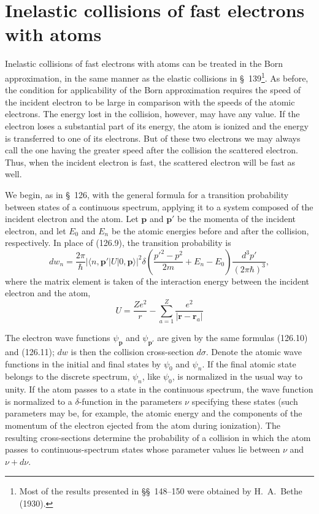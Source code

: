\section{Inelastic collisions of fast electrons with atoms}

Inelastic collisions of fast electrons with atoms can be treated in the Born approximation, in the same manner as the elastic collisions in \S~139\footnote{Most of the results presented in \S\S~148--150 were obtained by H.~A.~Bethe (1930).}. As before, the condition for applicability of the Born approximation requires the speed of the incident electron to be large in comparison with the speeds of the atomic electrons. The energy lost in the collision, however, may have any value. If the electron loses a substantial part of its energy, the atom is ionized and the energy is transferred to one of its electrons. But of these two electrons we may always call the one having the greater speed after the collision the scattered electron. Thus, when the incident electron is fast, the scattered electron will be fast as well.



We begin, as in \S~126, with the general formula for a transition probability between states of a continuous spectrum, applying it to a system composed of the incident electron and the atom. Let $\mathbf p$ and $\mathbf p'$ be the momenta of the incident electron, and let $E_0$ and $E_n$ be the atomic energies before and after the collision, respectively. In place of (126.9), the transition probability is
\begin{equation}
 dw_n=\frac{2\pi}{\hbar}|\langle n,\mathbf p'|U|0,\mathbf p\rangle|^2
 \delta\!\left(\frac{p'^2-p^2}{2m}+E_n-E_0\right)
 \frac{d^3p'}{(2\pi\hbar)^3},
 \tag{148.1}
\end{equation}
where the matrix element is taken of the interaction energy between the incident electron and the atom,
\[
 U=\frac{Ze^2}{r}-\sum_{a=1}^{Z}\frac{e^2}{|\mathbf r-\mathbf r_a|}
\]


The electron wave functions $\psi_{\mathbf p}$ and $\psi_{\mathbf p'}$ are given by the same formulas (126.10) and (126.11); $dw$ is then the collision cross-section $d\sigma$. Denote the atomic wave functions in the initial and final states by $\psi_0$ and $\psi_n$. If the final atomic state belongs to the discrete spectrum, $\psi_n$, like $\psi_0$, is normalized in the usual way to unity. If the atom passes to a state in the continuous spectrum, the wave function is normalized to a $\delta$-function in the parameters $\nu$ specifying these states (such parameters may be, for example, the atomic energy and the components of the momentum of the electron ejected from the atom during ionization). The resulting cross-sections determine the probability of a collision in which the atom passes to continuous-spectrum states whose parameter values lie between $\nu$ and $\nu+d\nu$.

